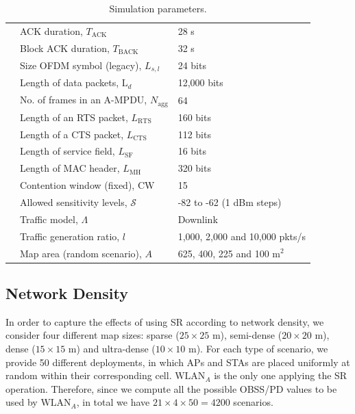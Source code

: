 \documentclass[comsoc]{IEEEtran}
\begin{document}
\begin{table}[h]
{\begin{tabular}{c|l|l|}
				\multicolumn{1}{|c|}{} & ACK duration, $T_\text{ACK}$ & 28 \textmu s\\
				\cline{2-3} 
				\multicolumn{1}{|c|}{} & Block ACK duration, $T_\text{BACK}$ & 32 \textmu s \\
				\cline{2-3} 
				\multicolumn{1}{|c|}{} &  Size OFDM symbol (legacy), $L_{s,l}$ & 24 bits \\
				\cline{2-3} 
				\multicolumn{1}{|c|}{} & Length of data packets, $\text{L}_{d}$ & 12,000 bits \\
				\cline{2-3} 
				\multicolumn{1}{|c|}{} & No. of frames in an A-MPDU, $N_{\text{agg}}$ & 64 \\
				\cline{2-3} 
				\multicolumn{1}{|c|}{} & Length of an RTS packet, $L_\text{RTS}$ & 160 bits \\
				\cline{2-3} 
				\multicolumn{1}{|c|}{} & Length of a CTS packet, $L_\text{CTS}$ & 112 bits \\
				\cline{2-3} 
				\multicolumn{1}{|c|}{} & Length of service field, $L_\text{SF}$ & 16 bits  \\
				\cline{2-3} 
				\multicolumn{1}{|c|}{} & Length of MAC header, $L_\text{MH}$ & 320 bits \\
				\cline{2-3} 
				\multicolumn{1}{|c|}{} & Contention window (fixed), $\text{CW}$ & 15 \\
				\cline{2-3} 
				\multicolumn{1}{|c|}{} & Allowed sensitivity levels, $\mathcal{S}$ & -82 to -62 (1 dBm steps) \\
				\hline
		    	\multicolumn{1}{|c|}{\multirow{2}{*}{\centering\rotatebox[origin=c]{90}{Misc.  }}} & Traffic model, $\Lambda$ & Downlink\\
				\cline{2-3} 
				\multicolumn{1}{|c|}{} & Traffic generation ratio, $l$ & 1,000, 2,000 and 10,000 pkts/s\\ 
				\cline{2-3} 
				\multicolumn{1}{|c|}{} & Map area (random scenario), $A$ & 625, 400, 225 and 100 m$^2$\\
				\hline
		\end{tabular}}
		\caption{Simulation parameters.}
		\label{table:parameters}
	\end{table}
	
	\subsection{Network Density}
	\label{section:random_scenarios_density}
    In order to capture the effects of using SR according to network density, we consider four different map sizes: sparse ($25\times25$ m), semi-dense ($20\times20$ m), dense ($15\times15$ m) and ultra-dense ($10\times10$ m). For each type of scenario, we provide 50 different deployments, in which APs and STAs are placed uniformly at random within their corresponding cell. $\text{WLAN}_A$ is the only one applying the SR operation. Therefore, since we compute all the possible OBSS/PD values to be used by $\text{WLAN}_A$, in total we have $21\times4\times50 = 4200$ scenarios.
	
\end{document}
